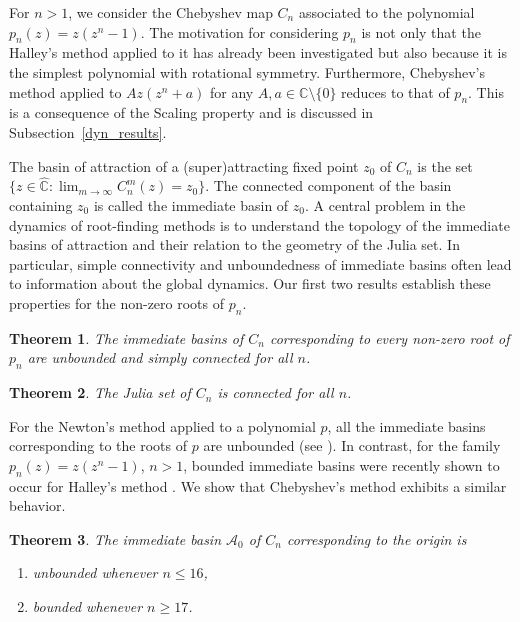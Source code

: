 \documentclass[12pt]{article}
\newtheorem{maintheorem}{Theorem}
\begin{document}
For $n>1$, we consider the Chebyshev map $C_n$ associated to the polynomial $p_n(z) =z(z^n-1)$. The motivation for considering $p_n$ is not only that the Halley's method applied to it has already been investigated \cite{CGJ2025,halley-liu-etal-2025} but also because it is the simplest polynomial with rotational symmetry. Furthermore, Chebyshev's method applied to $A z(z^n+a)$ for any $ A,a\in\mathbb{C}\setminus\{0\}$ reduces to that of $p_n$. This is a consequence of the Scaling property and is discussed in Subsection~\ref{dyn_results}.
	\par
The basin of attraction of a (super)attracting fixed point $z_0$ of $C_n$ is the set $\{z \in \widehat{\mathbb{C}}: \lim_{m \to \infty} C_n ^m (z)=z_0\}$. The connected component of the basin containing $z_0$ is called the immediate basin of $z_0$. A central problem in the dynamics of root-finding methods is to understand the topology of the immediate basins of attraction and their relation to the geometry of the Julia set. In particular, simple connectivity and unboundedness of immediate basins often lead to information about the global dynamics. Our first two results establish these properties for the non-zero roots of $p_n$.
	
	\begin{maintheorem}\label{Imm_unbd}
		The immediate basins of $C_n$ corresponding to every non-zero root of $p_n$ are unbounded and simply connected for all $n$.
	\end{maintheorem}
	
	\begin{maintheorem}\label{Connected_J.set}
		The Julia set of $C_n$ is connected  for all $n$.
	\end{maintheorem}
 For the Newton's method applied to a polynomial $p$, all the immediate basins corresponding to the roots of $p$ are unbounded (see \cite[Proposition 6]{HSS2001}). In contrast, for the family $p_n(z)=z(z^n-1)$, $ n>1$, bounded immediate basins were recently shown to occur for Halley's method \cite{CGJ2025,halley-liu-etal-2025}. We show that Chebyshev's method exhibits a similar behavior.
 
\begin{maintheorem}\label{Bdd_imm}
	The immediate basin $\mathcal{A}_0$ of $C_n$ corresponding to the origin is
	\begin{enumerate}
		\item unbounded whenever $n\leq 16$,
		\item bounded whenever $n\geq 17$.
	\end{enumerate}
\end{maintheorem}	
\end{document}

